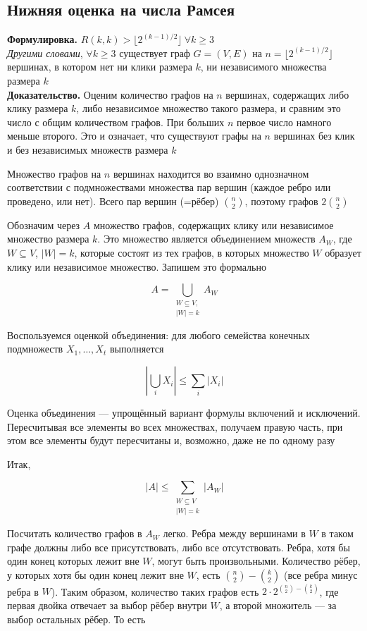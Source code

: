 \documentclass[a4paper]{article}
\begin{document}
\subsection{Нижняя оценка на числа Рамсея}
\textbf{Формулировка.} $R(k,k)>\lfloor 2^{(k-1)/2}\rfloor\ \forall k\geqslant3$\\[2mm]
\indent \textit{Другими словами}, $\forall k\geqslant3$ существует граф $G=(V,E)$ на $n=\lfloor2^{(k-1)/2}\rfloor$ вершинах, в котором нет ни клики размера $k$, ни независимого множества размера $k$\\[2mm]
\indent\textbf{Доказательство.} Оценим количество графов на $n$ вершинах, содержащих либо клику размера $k$, либо независимое 
множество такого размера, и сравним это число с общим количеством графов. При больших $n$ первое число намного меньше второго. Это и означает, что 
существуют графы на $n$ вершинах без клик и без независимых множеств размера $k$

Множество графов на $n$ вершинах находится во взаимно однозначном соответствии с подмножествами множества 
пар вершин (каждое ребро или проведено, или нет). Всего пар вершин (=рёбер) $\binom{n}{2}$, 
поэтому графов $2\binom{n}{2}$

Обозначим через $A$ множество графов, содержащих клику или независимое множество размера $k$. Это множество является объединением множеств $A_{W}$, 
где $W \subseteq V$, 
$|W|=k$, которые состоят из тех графов, в которых множество $W$ образует клику или независимое множество. Запишем это формально

$$
A=\bigcup_{\substack{W \subseteq V,\\|W|=k}} A_{W}
$$

Воспользуемся оценкой объединения: для любого семейства конечных подмножеств $X_{1}, \ldots, X_{t}$ выполняется

$$
\left|\bigcup_{i} X_{i}\right| \leqslant \sum_{i}\left|X_{i}\right|
$$

Оценка объединения — упрощённый вариант формулы включений и исключений. Пересчитывая все элементы во всех множествах, 
получаем правую часть, при этом все элементы будут пересчитаны и, возможно, даже не по одному разу

Итак,

$$
|A| \leqslant \sum_{\substack{W \subseteq V \\|W|=k}}\left|A_{W}\right|
$$

Посчитать количество графов в $A_{W}$ легко. Ребра между вершинами в $W$ в таком графе должны либо все присутствовать, либо все отсутствовать. 
Ребра, хотя бы один конец которых лежит вне $W$, могут быть произвольными. Количество рёбер, у которых хотя бы один конец лежит вне $W$, есть 
$\binom{n}{2}-\binom{k}{2}$ (все ребра минус ребра в $W$). Таким образом, 
количество таких графов есть $2 \cdot 2^{\binom{n}{2}-\binom{k}{2}}$, 
где первая двойка отвечает за выбор рёбер внутри $W$, а второй множитель — за выбор остальных рёбер. То есть
\end{document}
